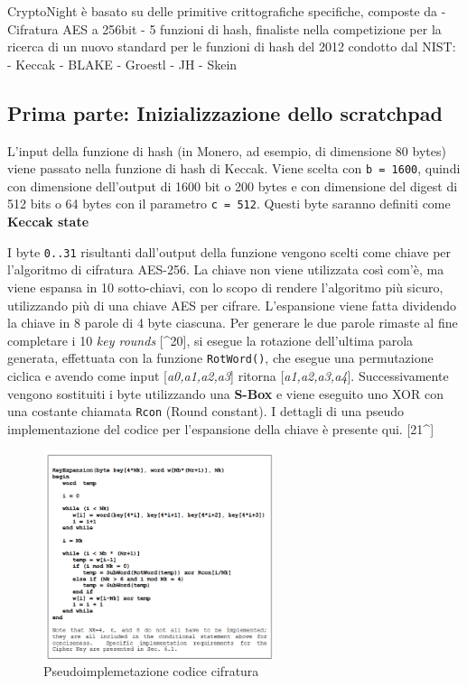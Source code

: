 CryptoNight è basato su delle primitive crittografiche specifiche,
composte da - Cifratura AES a 256bit - 5 funzioni di hash, finaliste
nella competizione per la ricerca di un nuovo standard per le funzioni
di hash del 2012 condotto dal NIST: - Keccak - BLAKE - Groestl - JH -
Skein

\subsection{Prima parte: Inizializzazione dello
scratchpad}\label{prima-parte-inizializzazione-dello-scratchpad}

L'input della funzione di hash (in Monero, ad esempio, di dimensione 80
bytes) viene passato nella funzione di hash di Keccak. Viene scelta con
\texttt{b\ =\ 1600}, quindi con dimensione dell'output di 1600 bit o 200
bytes e con dimensione del digest di 512 bits o 64 bytes con il
parametro \texttt{c\ =\ 512}. Questi byte saranno definiti come
\textbf{Keccak state} \cite{keccak_parameters}

I byte \texttt{0..31} risultanti dall'output della funzione vengono
scelti come chiave per l'algoritmo di cifratura AES-256. La chiave non
viene utilizzata così com'è, ma viene espansa in 10 sotto-chiavi, con lo
scopo di rendere l'algoritmo più sicuro, utilizzando più di una chiave
AES per cifrare. L'espansione viene fatta dividendo la chiave in 8
parole di 4 byte ciascuna. Per generare le due parole rimaste al fine
completare i 10 \emph{key rounds} {[}\^{}20{]}, si esegue la rotazione
dell'ultima parola generata, effettuata con la funzione
\texttt{RotWord()}, che esegue una permutazione ciclica e avendo come
input {[}\emph{a0,a1,a2,a3}{]} ritorna {[}\emph{a1,a2,a3,a4}{]}.
Successivamente vengono sostituiti i byte utilizzando una \textbf{S-Box}
e viene eseguito uno XOR con una costante chiamata \texttt{Rcon} (Round
constant). I dettagli di una pseudo implementazione del codice per
l'espansione della chiave è presente qui. {[}21\^{}{]}

\begin{figure}
  \centering
  \includegraphics[width = 0.60\textwidth]{image8.png}
  \caption{Pseudoimplemetazione codice cifratura}
\end{figure}
\newpage

